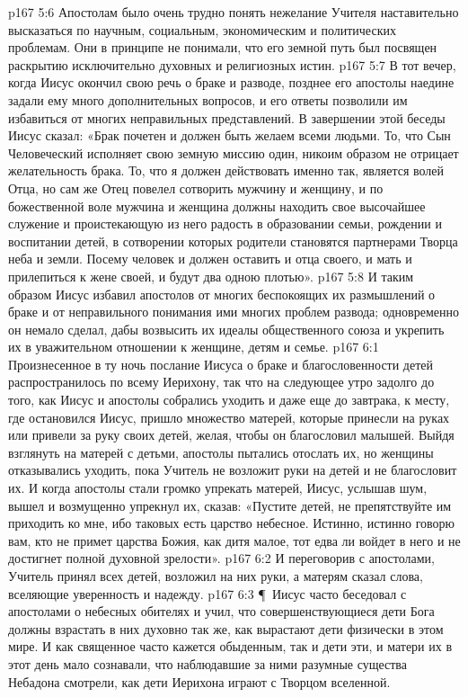\vs p167 5:6 Апостолам было очень трудно понять нежелание Учителя наставительно высказаться по научным, социальным, экономическим и политических проблемам. Они в принципе не понимали, что его земной путь был посвящен раскрытию исключительно духовных и религиозных истин.
\vs p167 5:7 В тот вечер, когда Иисус окончил свою речь о браке и разводе, позднее его апостолы наедине задали ему много дополнительных вопросов, и его ответы позволили им избавиться от многих неправильных представлений. В завершении этой беседы Иисус сказал: «Брак почетен и должен быть желаем всеми людьми. То, что Сын Человеческий исполняет свою земную миссию один, никоим образом не отрицает желательность брака. То, что я должен действовать именно так, является волей Отца, но сам же Отец повелел сотворить мужчину и женщину, и по божественной воле мужчина и женщина должны находить свое высочайшее служение и проистекающую из него радость в образовании семьи, рождении и воспитании детей, в сотворении которых родители становятся партнерами Творца неба и земли. Посему человек и должен оставить и отца своего, и мать и прилепиться к жене своей, и будут два одною плотью».
\vs p167 5:8 И таким образом Иисус избавил апостолов от многих беспокоящих их размышлений о браке и от неправильного понимания ими многих проблем развода; одновременно он немало сделал, дабы возвысить их идеалы общественного союза и укрепить их в уважительном отношении к женщине, детям и семье.
\vs p167 6:1 Произнесенное в ту ночь послание Иисуса о браке и благословенности детей распространилось по всему Иерихону, так что на следующее утро задолго до того, как Иисус и апостолы собрались уходить и даже еще до завтрака, к месту, где остановился Иисус, пришло множество матерей, которые принесли на руках или привели за руку своих детей, желая, чтобы он благословил малышей. Выйдя взглянуть на матерей с детьми, апостолы пытались отослать их, но женщины отказывались уходить, пока Учитель не возложит руки на детей и не благословит их. И когда апостолы стали громко упрекать матерей, Иисус, услышав шум, вышел и возмущенно упрекнул их, сказав: «Пустите детей, не препятствуйте им приходить ко мне, ибо таковых есть царство небесное. Истинно, истинно говорю вам, кто не примет царства Божия, как дитя малое, тот едва ли войдет в него и не достигнет полной духовной зрелости».
\vs p167 6:2 И переговорив с апостолами, Учитель принял всех детей, возложил на них руки, а матерям сказал слова, вселяющие уверенность и надежду.
\vs p167 6:3 \P\ Иисус часто беседовал с апостолами о небесных обителях и учил, что совершенствующиеся дети Бога должны взрастать в них духовно так же, как вырастают дети физически в этом мире. И как священное часто кажется обыденным, так и дети эти, и матери их в этот день мало сознавали, что наблюдавшие за ними разумные существа Небадона смотрели, как дети Иерихона играют с Творцом вселенной.
